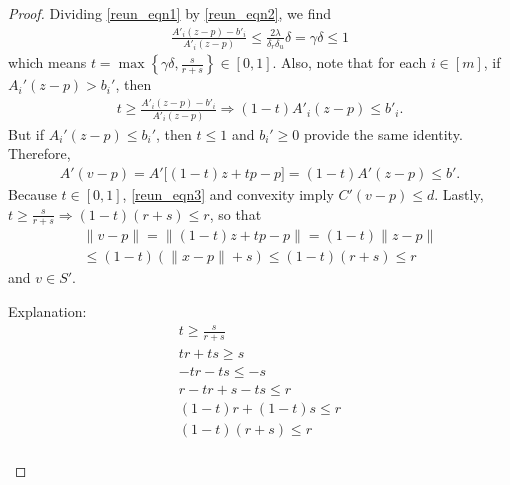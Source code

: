 \begin{proof}

Dividing \cref{reun_eqn1} by \cref{reun_eqn2}, we find
\begin{align*}
\frac{A'_i (z - p) - b'_i}{A'_i (z - p)} \le \frac{2\lambda}{\delta_r \delta_u}\delta = \gamma \delta \le 1
\end{align*}
which means $t = \max\left\{\gamma \delta, \frac{s}{r+s}\right\} \in [0, 1]$.
Also, note that for each $i \in [m]$, if $A_i'(z - p) > b_i'$, then
\begin{align*}
t \ge \frac{A'_i (z - p) - b'_i}{A'_i (z - p)}
\Longrightarrow (1-t) A'_i (z - p) \le b'_i.
\end{align*}
But if $A_i'(z - p) \le b_i'$, then $t \le 1$ and $b_i' \ge 0$ provide the same identity.
Therefore, 
\begin{align*}
A'(v - p) = A' \bigg[(1-t) z + tp - p\bigg] = (1-t) A' (z - p) \le b'.
\end{align*}
Because $t \in [0, 1]$, \cref{reun_eqn3} and convexity imply $C'(v - p) \le d$.
Lastly, $t \ge \frac{s}{r + s} \Longrightarrow (1 - t) \left(r + s\right) \le r$, so that
\begin{align*}
\|v - p\| 
= \|(1-t)z + t p - p\| 
= (1 - t) \|z - p\| \\
\le (1 - t) \left(\|x - p\| + s\right) 
\le (1 - t) \left(r + s\right) 
\le r
\end{align*}
and $v \in S'$.
\begin{boxedcomment}
Explanation:
\begin{align*}
t \ge \frac{s}{r + s} \\
 tr + ts \ge s \\
- tr - ts \le -s \\
r - tr + s - ts \le r \\
(1 - t) r + (1 - t)s \le r \\
(1 - t) \left(r + s\right) \le r \\
\end{align*}
\end{boxedcomment}


\end{proof}
